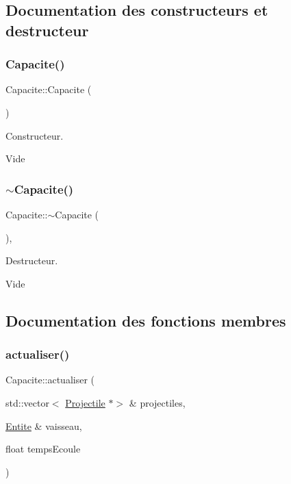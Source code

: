 \subsection{Documentation des constructeurs et destructeur}
\mbox{\label{class_capacite_a8a1aebc5b2332e366a3f207c23b4d363}} 
\subsubsection{\texorpdfstring{Capacite()}{Capacite()}}
{\footnotesize\ttfamily Capacite\+::\+Capacite (\begin{DoxyParamCaption}{ }\end{DoxyParamCaption})\hspace{0.3cm}{\ttfamily [default]}}



Constructeur. 

Vide \mbox{\label{class_capacite_a43be1570a24a64682ff3f034330779a9}} 
\subsubsection{\texorpdfstring{$\sim$\+Capacite()}{~Capacite()}}
{\footnotesize\ttfamily Capacite\+::$\sim$\+Capacite (\begin{DoxyParamCaption}{ }\end{DoxyParamCaption})\hspace{0.3cm}{\ttfamily [virtual]}, {\ttfamily [default]}}



Destructeur. 

Vide 

\subsection{Documentation des fonctions membres}
\mbox{\label{class_capacite_a75c9621d7a704fedb10ad29c6a697d64}} 
\subsubsection{\texorpdfstring{actualiser()}{actualiser()}}
{\footnotesize\ttfamily Capacite\+::actualiser (\begin{DoxyParamCaption}\item[{std\+::vector$<$ \hyperlink{class_projectile}{Projectile} $\ast$$>$ \&}]{projectiles,  }\item[{\hyperlink{class_entite}{Entite} \&}]{vaisseau,  }\item[{float}]{temps\+Ecoule }\end{DoxyParamCaption})\hspace{0.3cm}{\ttfamily [pure virtual]}}



